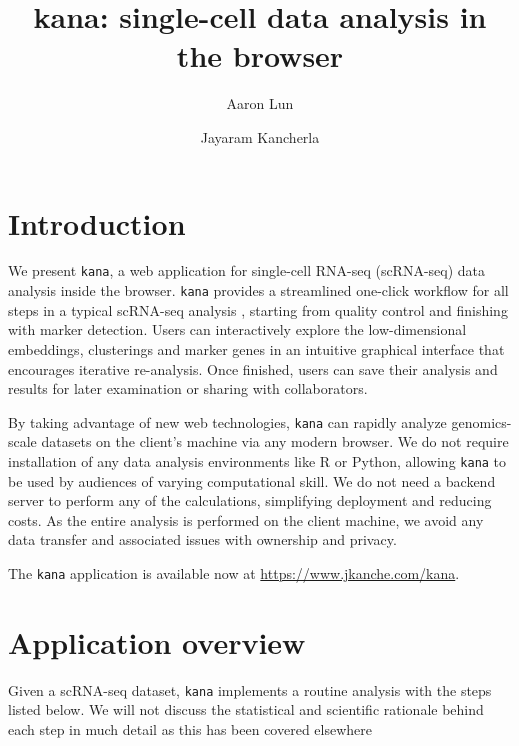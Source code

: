 \documentclass{article}
\title{kana: single-cell data analysis in the browser}
\author[1]{Aaron Lun}
\affil[1]{Genentech, Inc. South San Francisco, CA}
\author[1]{Jayaram Kancherla}
\begin{document}
\maketitle

\newcommand{\code}[1]{\texttt{#1}}

\section{Introduction}

We present \code{kana}, a web application for single-cell RNA-seq (scRNA-seq) data analysis inside the browser.
\code{kana} provides a streamlined one-click workflow for all steps in a typical scRNA-seq analysis \cite{amezquita2020orchestrating}, 
starting from quality control and finishing with marker detection.
Users can interactively explore the low-dimensional embeddings, clusterings and marker genes in an intuitive graphical interface that encourages iterative re-analysis.
Once finished, users can save their analysis and results for later examination or sharing with collaborators.

By taking advantage of new web technologies, \code{kana} can rapidly analyze genomics-scale datasets on the client's machine via any modern browser.
We do not require installation of any data analysis environments like R or Python, allowing \code{kana} to be used by audiences of varying computational skill.
We do not need a backend server to perform any of the calculations, simplifying deployment and reducing costs.
As the entire analysis is performed on the client machine, we avoid any data transfer and associated issues with ownership and privacy.

The \code{kana} application is available now at \url{https://www.jkanche.com/kana}.

\section{Application overview}

Given a scRNA-seq dataset, \code{kana} implements a routine analysis with the steps listed below.
We will not discuss the statistical and scientific rationale behind each step in much detail as this has been covered elsewhere \cite{oscabook} 
\end{document}
